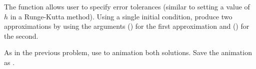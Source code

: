 \begin{comment}
Check out the sample code for animating two 2D objects simultaneously.
\begin{lstlisting}
from matplotlib.animation import FuncAnimation

def sine_cos_animation():
	#Calculate the data to be animated
	x = np.linspace(0, 2*np.pi, 200)[:-1]
	y1, y2 = np.sin(x), np.cos(x)
	
	#Create a figure and set the window boundaries
	fig = plt.figure()
	plt.xlim(0, 2*np.pi)
	plt.ylim(-1.2, 1.2)
	
	#Initiate empty lines of the correct dimension
	sin_drawing, = plt.plot([], [])
	cos_drawing, = plt.plot([], [])	#note the comma after the variable name
	
	#Define a function that updates each line
	def update(index):
		sin_drawing.set_data(x[:index], y1[:index])
		cos_drawing.set_data(x[:index], y2[:index])
		return sin_drawing, cos_drawing,
	
	a = FuncAnimation(fig, update, frames=len(x), interval=10)
	plt.show()
\end{lstlisting}

\begin{warn}
The above animation code works great for 2D animations, but \li{set_data()} is only good for 2D. When you want to animate in 3D, you will need an extra empty list in \li{plt.plot()} and a call to \li{set_3d_properties()} in the \li{update(index)} function.
\end{warn}

\section*{Animate}
You now know how to plot the Lorenz equation, how to plot multiple equations, and even how to animate (yay you, you're a star) simple plots.
It's time to put all your know-how to good use.
\end{comment}

\begin{problem}
The  function allows user to specify error tolerances (similar to setting a value of $h$ in a Runge-Kutta method). Using a single initial condition, produce two approximations by using the  arguments () for the first approximation and () for the second.

As in the previous problem, use  to animation both solutions. Save the animation as .
\end{problem}

